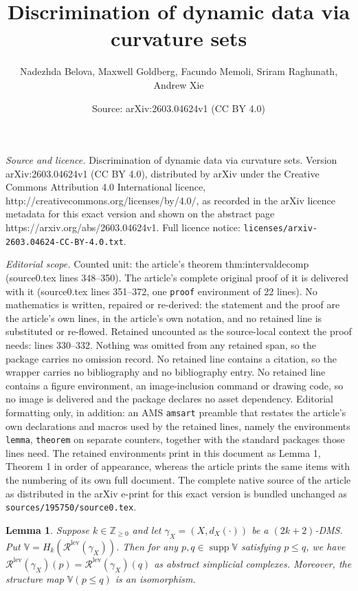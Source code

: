 \documentclass[10pt,a4paper]{amsart}
\title{Discrimination of dynamic data via curvature sets}
\author{Nadezhda Belova, Maxwell Goldberg, Facundo Memoli, Sriram Raghunath, Andrew Xie}
\date{Source: arXiv:2603.04624v1 (CC BY 4.0)}
\newtheorem{lemma}{Lemma}
\def\bbv{\mathbb{V}}
\DeclareMathOperator{\supp}{supp}
\begin{document}
\maketitle

\noindent\emph{Source and licence.} Discrimination of dynamic data via curvature sets. Version arXiv:2603.04624v1 (CC BY 4.0), distributed by arXiv under the Creative Commons Attribution 4.0 International licence, http://creativecommons.org/licenses/by/4.0/, as recorded in the arXiv licence metadata for this exact version and shown on the abstract page https://arxiv.org/abs/2603.04624v1. Full licence notice: \texttt{licenses/arxiv-2603.04624-CC-BY-4.0.txt}.\par\smallskip

\noindent\textit{Editorial scope.} Counted unit: the article's theorem thm:intervaldecomp (source0.tex lines 348--350). The article's complete original proof of it is delivered with it (source0.tex lines 351--372, one \texttt{proof} environment of 22 lines). No mathematics is written, repaired or re-derived: the statement and the proof are the article's own lines, in the article's own notation, and no retained line is substituted or re-flowed.  Retained uncounted as the source-local context the proof needs: lines 330--332.  Nothing was omitted from any retained span, so the package carries no omission record.  No retained line contains a citation, so the wrapper carries no bibliography and no bibliography entry.  No retained line contains a figure environment, an image-inclusion command or drawing code, so no image is delivered and the package declares no asset dependency.  Editorial formatting only, in addition: an AMS \texttt{amsart} preamble that restates the article's own declarations and macros used by the retained lines, namely the environments \texttt{lemma}, \texttt{theorem} on separate counters, together with the standard packages those lines need.  The retained environments print in this document as Lemma 1, Theorem 1 in order of appearance, whereas the article prints the same items with the numbering of its own full document.  The complete native source of the article as distributed in the arXiv e-print for this exact version is bundled unchanged as \texttt{sources/195750/source0.tex}.
    \begin{lemma}\label{lem:structuremaps}
        Suppose $k \in \mathbb{Z}_{\geq 0}$ and let $\gamma_X = (X, d_X(\cdot))$ be a $(2k+2)$-DMS. Put $\bbv = H_k(\mathcal{R}^{\mathrm{lev}}(\gamma_X))$. Then for any $p, q \in \supp \bbv$ satisfying $p \leq q$, we have $\mathcal{R}^{\mathrm{lev}}(\gamma_X)(p) = \mathcal{R}^{\mathrm{lev}}(\gamma_X)(q)$ as abstract simplicial complexes. Moreover, the structure map $\bbv(p \leq q)$ is an isomorphism.
    \end{lemma}
\end{document}
